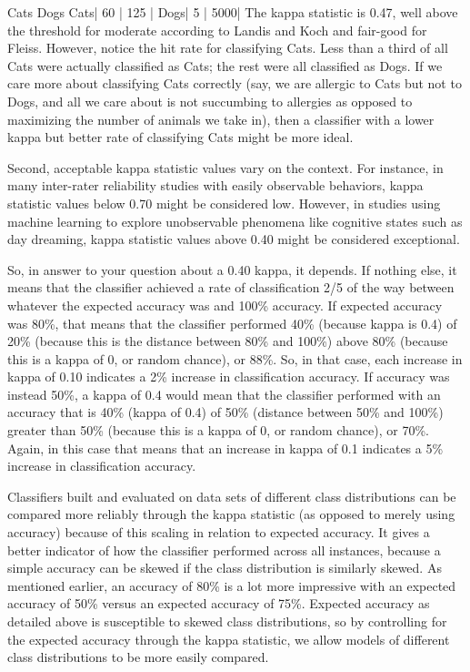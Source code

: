 \documentclass[caret-main.tex]{subfiles}
\begin{document}
     Cats Dogs
Cats| 60 | 125 |
Dogs| 5  | 5000|
\newpage
The kappa statistic is 0.47, well above the threshold for moderate according to Landis and Koch and fair-good for Fleiss. However, notice the hit rate for classifying Cats. Less than a third of all Cats were actually classified as Cats; the rest were all classified as Dogs. If we care more about classifying Cats correctly (say, we are allergic to Cats but not to Dogs, and all we care about is not succumbing to allergies as opposed to maximizing the number of animals we take in), then a classifier with a lower kappa but better rate of classifying Cats might be more ideal.

Second, acceptable kappa statistic values vary on the context. For instance, in many inter-rater reliability studies with easily observable behaviors, kappa statistic values below 0.70 might be considered low. However, in studies using machine learning to explore unobservable phenomena like cognitive states such as day dreaming, kappa statistic values above 0.40 might be considered exceptional.

So, in answer to your question about a 0.40 kappa, it depends. If nothing else, it means that the classifier achieved a rate of classification 2/5 of the way between whatever the expected accuracy was and 100\% accuracy. If expected accuracy was 80\%, that means that the classifier performed 40\% (because kappa is 0.4) of 20\% (because this is the distance between 80\% and 100\%) above 80\% (because this is a kappa of 0, or random chance), or 88\%. So, in that case, each increase in kappa of 0.10 indicates a 2\% increase in classification accuracy. If accuracy was instead 50\%, a kappa of 0.4 would mean that the classifier performed with an accuracy that is 40\% (kappa of 0.4) of 50\% (distance between 50\% and 100\%) greater than 50\% (because this is a kappa of 0, or random chance), or 70\%. Again, in this case that means that an increase in kappa of 0.1 indicates a 5\% increase in classification accuracy.

Classifiers built and evaluated on data sets of different class distributions can be compared more reliably through the kappa statistic (as opposed to merely using accuracy) because of this scaling in relation to expected accuracy. It gives a better indicator of how the classifier performed across all instances, because a simple accuracy can be skewed if the class distribution is similarly skewed. As mentioned earlier, an accuracy of 80\% is a lot more impressive with an expected accuracy of 50\% versus an expected accuracy of 75\%. Expected accuracy as detailed above is susceptible to skewed class distributions, so by controlling for the expected accuracy through the kappa statistic, we allow models of different class distributions to be more easily compared.
\end{document}
